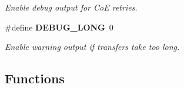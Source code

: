 \begin{DoxyCompactItemize}
\begin{DoxyCompactList}\small\item\em \-Enable debug output for \-Co\-E retries. \end{DoxyCompactList}\item 
\#define {\bf \-D\-E\-B\-U\-G\-\_\-\-L\-O\-N\-G}~0\label{fsm__coe_8c_acd46ca922701f9253467bb982265ad59}

\begin{DoxyCompactList}\small\item\em \-Enable warning output if transfers take too long. \end{DoxyCompactList}\end{DoxyCompactItemize}
\subsection*{\-Functions}
